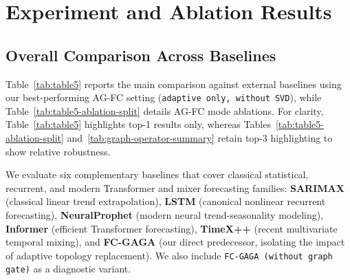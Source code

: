 \documentclass[runningheads]{llncs}
\begin{document}
\section{Experiment and Ablation Results}

\subsection{Overall Comparison Across Baselines}
Table~\ref{tab:table5} reports the main comparison against external baselines using our best-performing AG-FC setting (\texttt{adaptive only, without SVD}), while Table~\ref{tab:table5-ablation-split} details AG-FC mode ablations. For clarity, Table~\ref{tab:table5} highlights top-1 results only, whereas Tables~\ref{tab:table5-ablation-split} and~\ref{tab:graph-operator-summary} retain top-3 highlighting to show relative robustness.

We evaluate six complementary baselines that cover classical statistical, recurrent, and modern Transformer and mixer forecasting families: \textbf{SARIMAX} (classical linear trend extrapolation), \textbf{LSTM} (canonical nonlinear recurrent forecasting), \textbf{NeuralProphet} (modern neural trend-seasonality modeling), \textbf{Informer} (efficient Transformer forecasting), \textbf{TimeX++} (recent multivariate temporal mixing), and \textbf{FC-GAGA} (our direct predecessor, isolating the impact of adaptive topology replacement). We also include \texttt{FC-GAGA (without graph gate)} as a diagnostic variant.
\end{document}
